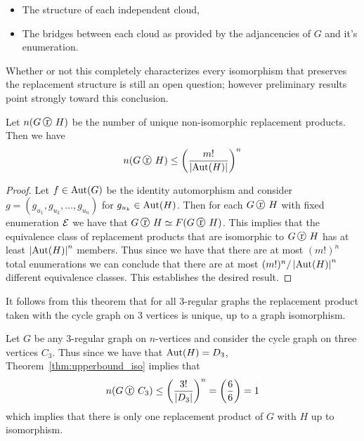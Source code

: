 \begin{itemize}
\item The structure of each independent cloud,
\item The bridges between each cloud as provided by the adjancencies of $G$ and it's enumeration.
\end{itemize}

\noindent
Whether or not this completely characterizes every isomorphism that preserves the replacement structure is still an open question; however preliminary results point strongly toward this conclusion.


\begin{theorem}
\label{thm:upperbound_iso}
Let $n( G \replacement H)$ be the number of unique non-isomorphic replacement products. Then we have \[ n(G \replacement H) \leq \left(\frac{m!}{\left| \Aut(H)\right|}  \right)^{n}  \]
\end{theorem}
\begin{proof}
Let $f \in \operatorname{\mathrm{Aut}}(G)$ be the identity automorphism and consider $g = \left( g_{u_1}, g_{u_2}, \ldots, g_{u_n} \right)$ for $g_{u_k} \in \operatorname{\mathrm{Aut}}(H)$. Then for each $G \replacement H$ with fixed enumeration $\operatorname{\mathcal{E}}$ we have that $G \replacement H \simeq F(G \replacement H)$. This implies that the equivalence class of replacement products that are isomorphic to $G \replacement H$ has at least $\left| \operatorname{\mathrm{Aut}}(H) \right|^n$ members. Thus since we have that there are at most $(m!)^{n}$ total enumerations we can conclude that there are at most $ (m!)^{n} / \left| \operatorname{\mathrm{Aut}}(H) \right|^{n}$ different equivalence classes. This establishes the desired result.
\end{proof}
It follows from this theorem that for all $3$-regular graphs the replacement product taken with the cycle graph on $3$ vertices is unique, up to a graph isomorphism.

\begin{example}
  Let $G$ be any $3$-regular graph on $n$-vertices and consider the cycle graph on three vertices $C_3$. Thus since we have that $\operatorname{\mathrm{Aut}}(H) = D_3$, Theorem~\ref{thm:upperbound_iso} implies that \[  n(G \replacement C_3 ) \leq \left( \frac{ 3! }{ \card{D_3}} \right)^n = \left( \frac{6}{6} \right) = 1    \] which implies that there is only one replacement product of $G$ with $H$ up to isomorphism.
\end{example}

